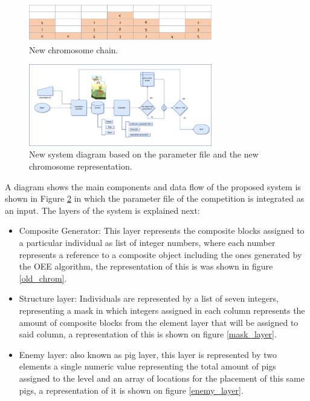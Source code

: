 \documentclass[conference]{IEEEtran}
\begin{document}
    \begin{figure}[htbp]
    \centerline{\includegraphics[width=80mm]{Images/chromosome_chain_new_model.png}}
    \caption{New chromosome chain.}
    \label{new_chrom}
    \end{figure}
    
    \begin{figure}[htbp]
    \centerline{\includegraphics[width=80mm]{Images/new_model_v2.png}}
    \caption{New system diagram based on the parameter file and the new chromosome representation.}
    \label{new_model}
    \end{figure}
    
    A diagram shows the main components and data flow of the proposed system
    is shown in Figure \ref{new_model} in which the parameter file of the competition 
    is integrated as an input. The layers of the system is explained next:
    
    \begin{itemize}
        \item Composite Generator:  This layer represents the composite blocks
        assigned to a particular individual as list of integer numbers, where
        each number represents a reference to a composite object including the
        ones generated by the OEE algorithm, the representation of this is was
        shown in figure \ref{old_chrom}.
        \item Structure layer: Individuals are represented by a list of seven
        integers, representing a mask in which integers assigned in each column
        represents the amount of composite blocks from the element layer that
        will be assigned to said column, a representation of this is shown on
        figure \ref{mask_layer}.
        \item Enemy layer: also known as pig layer, this layer is represented by
        two elements a single numeric value representing the total amount of
        pigs assigned to the level and an array of locations for the placement
        of this same pigs, a representation of it is shown on figure
        \ref{enemy_layer}. 
    \end{itemize}
    
\end{document}
